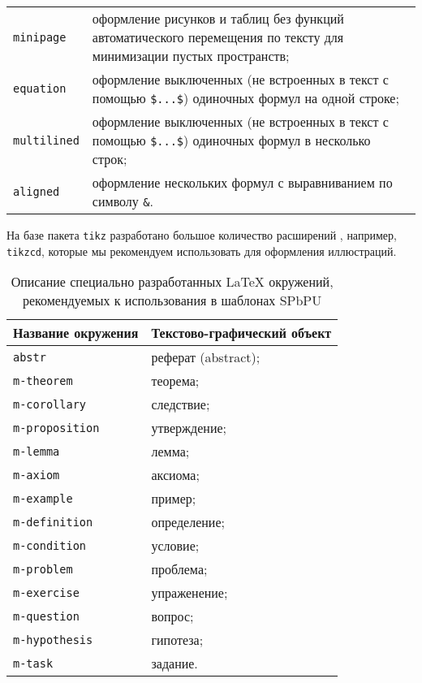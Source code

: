 \begin{table} [htbp]
\begin{SingleSpace}
\begin{tabular}{|l|p{11cm}|}
			\verb|minipage| & {оформление рисунков и таблиц без функций автоматического перемещения по тексту для  минимизации пустых пространств;} \\
			\verb|equation| & {оформление выключенных (не встроенных в текст с помощью \verb|$...$|) одиночных формул на одной строке;} \\
			\verb|multilined| &{оформление выключенных (не встроенных в текст с помощью \verb|$...$|) одиночных формул в несколько строк;} \\ 
			\verb|aligned| &{оформление нескольких формул с выравниванием по символу \verb|&|.} \\
			\hline		
		\end{tabular}	
	\end{SingleSpace}
	\end{table}

На базе пакета \verb|tikz| разработано большое количество расширений \cite{ctan-tikz}, например, \verb|tikzcd|, которые мы рекомендуем использовать для оформления иллюстраций.

	\begin{table} [htbp]%
	\centering
	\caption{Описание специально разработанных \LaTeX{} окружений, рекомендуемых к использования в шаблонах SPbPU}%
	\label{tab:enum-spbpu}
	\begin{SingleSpace}
		\begin{tabular}{|l|l|}
			\hline
			Название окружения & Текстово-графический объект\\
			\hline
			\verb|abstr|	 & реферат (abstract); \\
			\verb|m-theorem| & теорема; \\ 
			\verb|m-corollary| & следствие; \\
			\verb|m-proposition| & утверждение; \\
			\verb|m-lemma|   & лемма; \\
			\verb|m-axiom| & аксиома; \\
			\verb|m-example| & пример; \\
			\verb|m-definition| &  определение; \\
			\verb|m-condition| & условие;\\
			\verb|m-problem| & проблема; \\
			\verb|m-exercise| & упраженение;\\
			\verb|m-question| & вопрос;\\
			\verb|m-hypothesis| & гипотеза;\\
			\verb|m-task| & задание. \\
			\hline		
		\end{tabular}	
	\end{SingleSpace}
\end{table}

